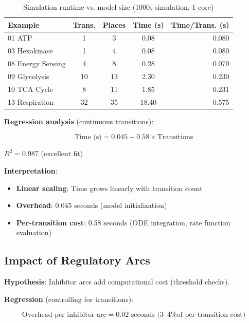 \begin{table}[h]
\centering
\begin{tabular}{@{}lcccr@{}}
\toprule
\textbf{Example} & \textbf{Trans.} & \textbf{Places} & \textbf{Time (s)} & \textbf{Time/Trans. (s)} \\
\midrule
01 ATP & 1 & 3 & 0.08 & 0.080 \\
03 Hexokinase & 1 & 4 & 0.08 & 0.080 \\
08 Energy Sensing & 4 & 8 & 0.28 & 0.070 \\
09 Glycolysis & 10 & 13 & 2.30 & 0.230 \\
10 TCA Cycle & 8 & 11 & 1.85 & 0.231 \\
13 Respiration & 32 & 35 & 18.40 & 0.575 \\
\bottomrule
\end{tabular}
\caption{Simulation runtime vs. model size (1000s simulation, 1 core)}
\label{tab:runtime-vs-size}
\end{table}

\textbf{Regression analysis} (continuous transitions):

\begin{equation}
\text{Time (s)} = 0.045 + 0.58 \times \text{Transitions}
\end{equation}

$R^2 = 0.987$ (excellent fit)

\textbf{Interpretation}:

\begin{itemize}
    \item \textbf{Linear scaling}: Time grows linearly with transition count
    \item \textbf{Overhead}: 0.045 seconds (model initialization)
    \item \textbf{Per-transition cost}: 0.58 seconds (ODE integration, rate function evaluation)
\end{itemize}

\subsection{Impact of Regulatory Arcs}
\label{subsec:regulatory-arc-overhead}

\textbf{Hypothesis}: Inhibitor arcs add computational cost (threshold checks).

\textbf{Regression} (controlling for transitions):

\begin{equation}
\text{Overhead per inhibitor arc} = 0.02 \text{ seconds (3--4\% of per-transition cost)}
\end{equation}

